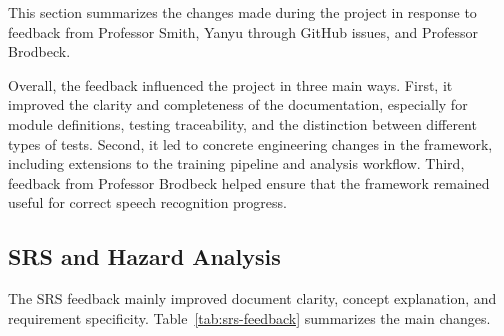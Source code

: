 \documentclass{article}
\begin{document}


This section summarizes the changes made during the project in response to feedback from Professor Smith, Yanyu through GitHub issues, and Professor Brodbeck.

Overall, the feedback influenced the project in three main ways.
First, it improved the clarity and completeness of the documentation, especially for module definitions, testing traceability, and the distinction between different types of tests.
Second, it led to concrete engineering changes in the framework, including extensions to the training pipeline and analysis workflow.
Third, feedback from Professor Brodbeck helped ensure that the framework remained useful for correct speech recognition progress.










\subsection{SRS and Hazard Analysis}

The SRS feedback mainly improved document clarity, concept explanation, and requirement specificity.
Table~\ref{tab:srs-feedback} summarizes the main changes.
\end{document}
